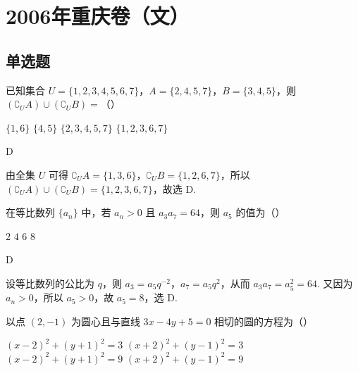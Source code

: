 
\chapter{2006年重庆卷（文）}
\section{单选题}
\begin{problem}
已知集合 \(U = \{1, 2, 3, 4, 5, 6, 7\}\)，\(A = \{2, 4, 5, 7\}\)，\(B = \{3, 4, 5\}\)，则 \(\left(\complement_U A\right) \cup \left(\complement_U B\right) =\)（\quad）

\choices
    {\(\{1, 6\}\)}
    {\(\{4, 5\}\)}
    {\(\{2, 3, 4, 5, 7\}\)}
    {\(\{1, 2, 3, 6, 7\}\)}
\end{problem}

\begin{answer}
D
\end{answer}

\begin{solution}
由全集 \(U\) 可得 \(\complement_U A=\{1,3,6\}\)，\(\complement_U B=\{1,2,6,7\}\)，所以
\(\left(\complement_U A\right)\cup\left(\complement_U B\right)=\{1,2,3,6,7\}\)，故选 D.
\end{solution}

\begin{problem}
在等比数列 \(\{a_{n}\}\) 中，若 \(a_{n} > 0\) 且 \(a_{3} a_{7} = 64\)，则 \(a_{5}\) 的值为（\quad）

\choices
    {\(2\)}
    {\(4\)}
    {\(6\)}
    {\(8\)}
\end{problem}

\begin{answer}
D
\end{answer}

\begin{solution}
设等比数列的公比为 \(q\)，则 \(a_3=a_5q^{-2}\)，\(a_7=a_5q^2\)，从而 \(a_3a_7=a_5^2=64\). 又因为 \(a_n>0\)，所以 \(a_5>0\)，故 \(a_5=8\)，选 D.
\end{solution}

\begin{problem}
以点 \((2, -1)\) 为圆心且与直线 \(3x - 4y + 5 = 0\) 相切的圆的方程为（\quad）

\choices
    {\((x - 2)^{2} + (y + 1)^{2} = 3\)}
    {\((x + 2)^{2} + (y - 1)^{2} = 3\)}
    {\((x - 2)^{2} + (y + 1)^{2} = 9\)}
    {\((x + 2)^{2} + (y - 1)^{2} = 9\)}
\end{problem}

